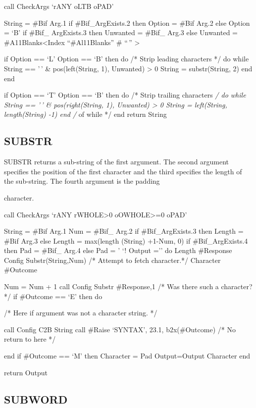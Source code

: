 call CheckArgs `rANY oLTB oPAD'

String = \#Bif Arg.1 if \#Bif\_ArgExists.2 then Option = \#Bif Arg.2
else Option = `B' if \#Bif\_ ArgExists.3 then Unwanted = \#Bif\_ Arg.3
else Unwanted = \#A11Blanks\textless Index ``\#Al11Blanks'' \# ``\,''
\textgreater{}

if Option == `L' \textbar{} Option == `B' then do /* Strip leading
characters */ do while String == '\,' \& pos(left(String, 1), Unwanted)
\textgreater{} 0 String = substr(String, 2) end end

if Option == `T' \textbar{} Option == `B' then do /* Strip trailing
characters \emph{/ do while String == '\,' \& pos(right(String, 1),
Unwanted) \textgreater{} 0 String = left(String, length(String) -1) end
/} of while */ end return String

\hypertarget{substr}{%
\subsection{SUBSTR}\label{substr}}

SUBSTR returns a sub-string of the first argument. The second argument
specifies the position of the first character and the third specifies
the length of the sub-string. The fourth argument is the padding

character.

call CheckArgs `rANY rWHOLE\textgreater0 oOWHOLE\textgreater=0 oPAD'

String = \#Bif Arg.1 Num = \#Bif\_ Arg.2 if \#Bif\_ArgExists.3 then
Length = \#Bif Arg.3 else Length = max(length (String) +1-Num, 0) if
\#Bif\_ArgExists.4 then Pad = \#Bif\_ Arg.4 else Pad = ' `! Output =''
do Length \#Response Config Substr(String,Num) /* Attempt to fetch
character.*/ Character \#Outcome

Num = Num + 1 call Config Substr \#Response,1 /* Was there such a
character? */ if \#Outcome == `E' then do

/* Here if argument was not a character string. */

call Config C2B String call \#Raise `SYNTAX', 23.1, b2x(\#Outcome) /* No
return to here */

end if \#Outcome == `M' then Character = Pad Output=Output \textbar{}
\textbar{} Character end

return Output

\hypertarget{subword}{%
\subsection{SUBWORD}\label{subword}}

